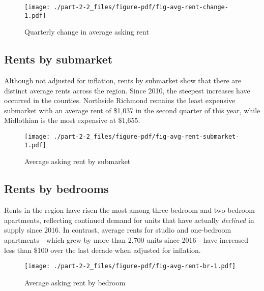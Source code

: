 \documentclass[
  letterpaper,
  DIV=11,
  numbers=noendperiod]{scrreprt}
\begin{document}
\begin{figure}

{\centering \texttt{[image: ./part-2-2\_files/figure-pdf/fig-avg-rent-change-1.pdf]}

}

\caption{\label{fig-avg-rent-change}Quarterly change in average asking
rent}

\end{figure}

\hypertarget{rents-by-submarket}{%
\subsection{Rents by submarket}\label{rents-by-submarket}}

Although not adjusted for inflation, rents by submarket show that there
are distinct average rents across the region. Since 2010, the steepest
increases have occurred in the counties. Northside Richmond remains the
least expensive submarket with an average rent of \$1,037 in the second
quarter of this year, while Midlothian is the most expensive at \$1,655.

\begin{figure}

{\centering \texttt{[image: ./part-2-2\_files/figure-pdf/fig-avg-rent-submarket-1.pdf]}

}

\caption{\label{fig-avg-rent-submarket}Average asking rent by submarket}

\end{figure}

\hypertarget{rents-by-bedrooms}{%
\subsection{Rents by bedrooms}\label{rents-by-bedrooms}}

Rents in the region have risen the most among three-bedroom and
two-bedroom apartments, reflecting continued demand for units that have
actually \emph{declined} in supply since 2016. In contrast, average
rents for studio and one-bedroom apartments---which grew by more than
2,700 units since 2016---have increased less than \$100 over the last
decade when adjusted for inflation.

\begin{figure}

{\centering \texttt{[image: ./part-2-2\_files/figure-pdf/fig-avg-rent-br-1.pdf]}

}

\caption{\label{fig-avg-rent-br}Average asking rent by bedroom}

\end{figure}
\end{document}
